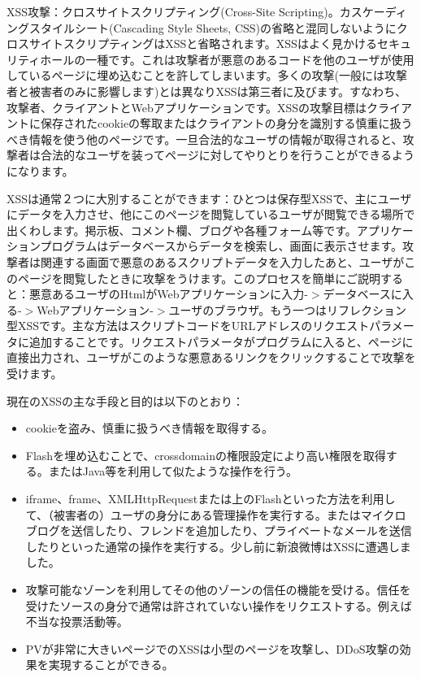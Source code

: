 XSS攻撃：クロスサイトスクリプティング(Cross-Site Scripting)。カスケーディングスタイルシート(Cascading Style Sheets, CSS)の省略と混同しないようにクロスサイトスクリプティングはXSSと省略されます。XSSはよく見かけるセキュリティホールの一種です。これは攻撃者が悪意のあるコードを他のユーザが使用しているページに埋め込むことを許してしまいます。多くの攻撃(一般には攻撃者と被害者のみに影響します)とは異なりXSSは第三者に及びます。すなわち、攻撃者、クライアントとWebアプリケーションです。XSSの攻撃目標はクライアントに保存されたcookieの奪取またはクライアントの身分を識別する慎重に扱うべき情報を使う他のページです。一旦合法的なユーザの情報が取得されると、攻撃者は合法的なユーザを装ってページに対してやりとりを行うことができるようになります。

XSSは通常２つに大別することができます：ひとつは保存型XSSで、主にユーザにデータを入力させ、他にこのページを閲覧しているユーザが閲覧できる場所で出くわします。掲示板、コメント欄、ブログや各種フォーム等です。アプリケーションプログラムはデータベースからデータを検索し、画面に表示させます。攻撃者は関連する画面で悪意のあるスクリプトデータを入力したあと、ユーザがこのページを閲覧したときに攻撃をうけます。このプロセスを簡単にご説明すると：悪意あるユーザのHtmlがWebアプリケーションに入力-$>$データベースに入る-$>$Webアプリケーション-$>$ユーザのブラウザ。もう一つはリフレクション型XSSです。主な方法はスクリプトコードをURLアドレスのリクエストパラメータに追加することです。リクエストパラメータがプログラムに入ると、ページに直接出力され、ユーザがこのような悪意あるリンクをクリックすることで攻撃を受けます。

現在のXSSの主な手段と目的は以下のとおり：

\begin{itemize}
  \item cookieを盗み、慎重に扱うべき情報を取得する。
  \item Flashを埋め込むことで、crossdomainの権限設定により高い権限を取得する。またはJava等を利用して似たような操作を行う。
  \item iframe、frame、XMLHttpRequestまたは上のFlashといった方法を利用して、（被害者の）ユーザの身分にある管理操作を実行する。またはマイクロブログを送信したり、フレンドを追加したり、プライベートなメールを送信したりといった通常の操作を実行する。少し前に新浪微博はXSSに遭遇しました。
  \item 攻撃可能なゾーンを利用してその他のゾーンの信任の機能を受ける。信任を受けたソースの身分で通常は許されていない操作をリクエストする。例えば不当な投票活動等。
  \item PVが非常に大きいページでのXSSは小型のページを攻撃し、DDoS攻撃の効果を実現することができる。
\end{itemize}
